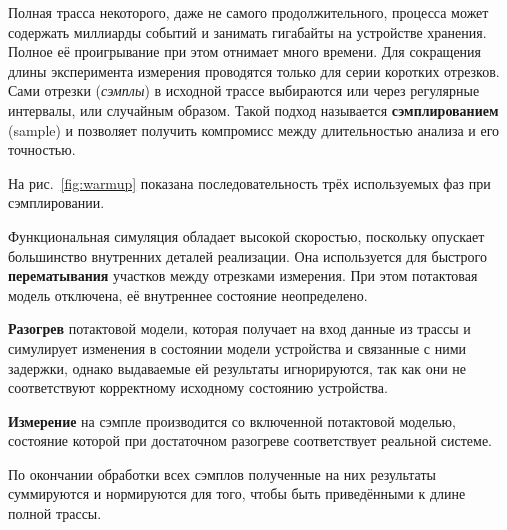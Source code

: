 Полная трасса некоторого, даже не самого продолжительного, процесса может содержать миллиарды событий и занимать гигабайты на устройстве хранения. Полное её проигрывание при этом отнимает много времени. Для сокращения длины эксперимента измерения проводятся только для серии коротких отрезков. Сами отрезки (\textit{сэмплы}) в исходной трассе выбираются или через регулярные интервалы, или случайным образом. Такой подход называется \textbf{сэмплированием} (\abbr sample) и позволяет получить компромисс между длительностью анализа и его точностью.

На рис.~\ref{fig:warmup} показана последовательность трёх используемых фаз при сэмплировании.
\begin{itemize*}
    \item Функциональная симуляция обладает высокой скоростью, поскольку опускает большинство внутренних деталей реализации. Она используется для быстрого \textbf{перематывания} участков между отрезками измерения. При этом потактовая модель отключена, её внутреннее состояние неопределено.
    \item \textbf{Разогрев} потактовой модели, которая получает на вход данные из трассы и симулирует изменения в состоянии модели устройства и связанные с ними задержки,  однако выдаваемые ей результаты игнорируются, так как они не соответствуют корректному исходному состоянию устройства. 
    \item \textbf{Измерение} на сэмпле производится со включенной потактовой моделью, состояние которой при достаточном разогреве соответствует реальной системе.
    \item По окончании обработки всех сэмплов полученные на них результаты суммируются и нормируются для  того, чтобы быть приведёнными к длине полной трассы.
\end{itemize*}

